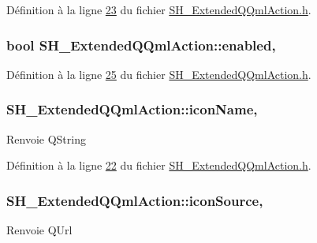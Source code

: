Définition à la ligne \hyperlink{SH__ExtendedQQmlAction_8h_source_l00023}{23} du fichier \hyperlink{SH__ExtendedQQmlAction_8h_source}{S\-H\-\_\-\-Extended\-Q\-Qml\-Action.\-h}.

\hypertarget{classSH__ExtendedQQmlAction_ac2d51d5f8e6ee51883a8ea1efe974ad2}{
\subsubsection[{enabled}]{\setlength{\rightskip}{0pt plus 5cm}bool S\-H\-\_\-\-Extended\-Q\-Qml\-Action\-::enabled\hspace{0.3cm}{\ttfamily [read]}, {\ttfamily [write]}}}\label{classSH__ExtendedQQmlAction_ac2d51d5f8e6ee51883a8ea1efe974ad2}


Définition à la ligne \hyperlink{SH__ExtendedQQmlAction_8h_source_l00025}{25} du fichier \hyperlink{SH__ExtendedQQmlAction_8h_source}{S\-H\-\_\-\-Extended\-Q\-Qml\-Action.\-h}.

\hypertarget{classSH__ExtendedQQmlAction_a9107464c9df5a0ae59acd8ccbea7328a}{
\subsubsection[{icon\-Name}]{\setlength{\rightskip}{0pt plus 5cm}S\-H\-\_\-\-Extended\-Q\-Qml\-Action\-::icon\-Name\hspace{0.3cm}{\ttfamily [read]}, {\ttfamily [write]}}}\label{classSH__ExtendedQQmlAction_a9107464c9df5a0ae59acd8ccbea7328a}
\begin{DoxyReturn}{Renvoie}
Q\-String 
\end{DoxyReturn}


Définition à la ligne \hyperlink{SH__ExtendedQQmlAction_8h_source_l00022}{22} du fichier \hyperlink{SH__ExtendedQQmlAction_8h_source}{S\-H\-\_\-\-Extended\-Q\-Qml\-Action.\-h}.

\hypertarget{classSH__ExtendedQQmlAction_a569753d493f0ddc2fc0929e35268b4ff}{
\subsubsection[{icon\-Source}]{\setlength{\rightskip}{0pt plus 5cm}S\-H\-\_\-\-Extended\-Q\-Qml\-Action\-::icon\-Source\hspace{0.3cm}{\ttfamily [read]}, {\ttfamily [write]}}}\label{classSH__ExtendedQQmlAction_a569753d493f0ddc2fc0929e35268b4ff}
\begin{DoxyReturn}{Renvoie}
Q\-Url 
\end{DoxyReturn}


